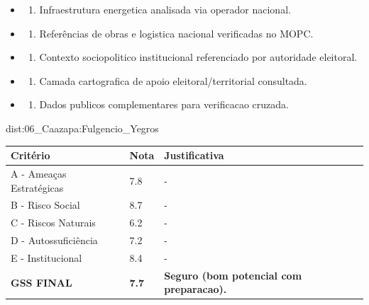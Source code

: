 {\begin{itemize}
\item
  \begin{enumerate}
  \def\labelenumi{\arabic{enumi})}
  \setcounter{enumi}{7}
  \tightlist
  \item
    Infraestrutura energetica analisada via operador nacional.
  \end{enumerate}
\item
  \begin{enumerate}
  \def\labelenumi{\arabic{enumi})}
  \setcounter{enumi}{8}
  \tightlist
  \item
    Referências de obras e logistica nacional verificadas no MOPC.
  \end{enumerate}
\item
  \begin{enumerate}
  \def\labelenumi{\arabic{enumi})}
  \setcounter{enumi}{9}
  \tightlist
  \item
    Contexto sociopolitico institucional referenciado por autoridade
    eleitoral.
  \end{enumerate}
\item
  \begin{enumerate}
  \def\labelenumi{\arabic{enumi})}
  \setcounter{enumi}{10}
  \tightlist
  \item
    Camada cartografica de apoio eleitoral/\allowbreak territorial consultada.
  \end{enumerate}
\item
  \begin{enumerate}
  \def\labelenumi{\arabic{enumi})}
  \setcounter{enumi}{11}
  \tightlist
  \item
    Dados publicos complementares para verificacao cruzada.
  \end{enumerate}
\end{itemize}}{dist:06_Caazapa:Fulgencio_Yegros}
\begin{table}[ht!]
\small \begin{tabular}{p{3.0cm}p{0.8cm}p{6.0cm}} \toprule
\textbf{Critério} & \textbf{Nota} & \textbf{Justificativa} \\ \midrule
A - Ameaças Estratégicas & 7.8 & - \\
B - Risco Social & 8.7 & - \\
C - Riscos Naturais & 6.2 & - \\
D - Autossuficiência & 7.2 & - \\
E - Institucional & 8.4 & - \\
\midrule \textbf{GSS FINAL} & \textbf{7.7} & \textbf{Seguro (bom potencial com preparacao).} \\ \bottomrule \end{tabular}
\end{table}
